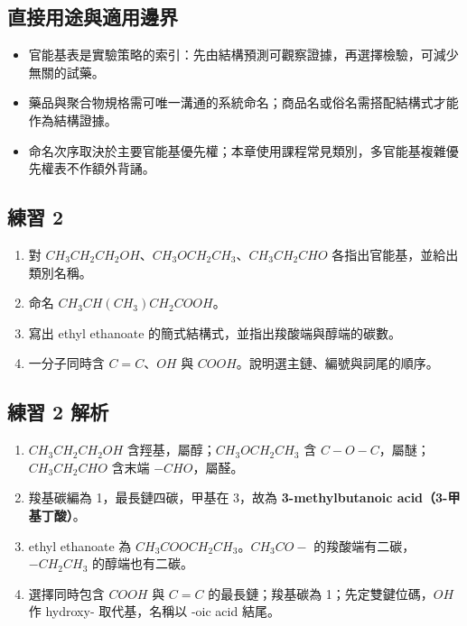 \documentclass[11pt,a4paper]{article}
\providecommand{\tightlist}{%
  \setlength{\itemsep}{0pt}\setlength{\parskip}{0pt}}
\begin{document}
\subsection{直接用途與適用邊界}\label{ux76f4ux63a5ux7528ux9014ux8207ux9069ux7528ux908aux754c-1}

\begin{itemize}
\tightlist
\item
  官能基表是實驗策略的索引：先由結構預測可觀察證據，再選擇檢驗，可減少無關的試藥。
\item
  藥品與聚合物規格需可唯一溝通的系統命名；商品名或俗名需搭配結構式才能作為結構證據。
\item
  命名次序取決於主要官能基優先權；本章使用課程常見類別，多官能基複雜優先權表不作額外背誦。
\end{itemize}

\subsection{練習 2}\label{ux7df4ux7fd2-2}

\begin{enumerate}
\def\labelenumi{\arabic{enumi}.}
\tightlist
\item
  對 \(CH_3CH_2CH_2OH\)、\(CH_3OCH_2CH_3\)、\(CH_3CH_2CHO\) 各指出官能基，並給出類別名稱。
\item
  命名 \(CH_3CH(CH_3)CH_2COOH\)。
\item
  寫出 ethyl ethanoate 的簡式結構式，並指出羧酸端與醇端的碳數。
\item
  一分子同時含 \(C=C\)、\(OH\) 與 \(COOH\)。說明選主鏈、編號與詞尾的順序。
\end{enumerate}

\subsection{練習 2 解析}\label{ux7df4ux7fd2-2-ux89e3ux6790}

\begin{enumerate}
\def\labelenumi{\arabic{enumi}.}
\tightlist
\item
  \(CH_3CH_2CH_2OH\) 含羥基，屬醇；\(CH_3OCH_2CH_3\) 含 \(C-O-C\)，屬醚；\(CH_3CH_2CHO\) 含末端 \(-CHO\)，屬醛。
\item
  羧基碳編為 1，最長鏈四碳，甲基在 3，故為 \textbf{3-methylbutanoic acid（3-甲基丁酸）}。
\item
  ethyl ethanoate 為 \(CH_3COOCH_2CH_3\)。\(CH_3CO-\) 的羧酸端有二碳，\(-CH_2CH_3\) 的醇端也有二碳。
\item
  選擇同時包含 \(COOH\) 與 \(C=C\) 的最長鏈；羧基碳為 1；先定雙鍵位碼，\(OH\) 作 hydroxy- 取代基，名稱以 -oic acid 結尾。
\end{enumerate}
\end{document}
